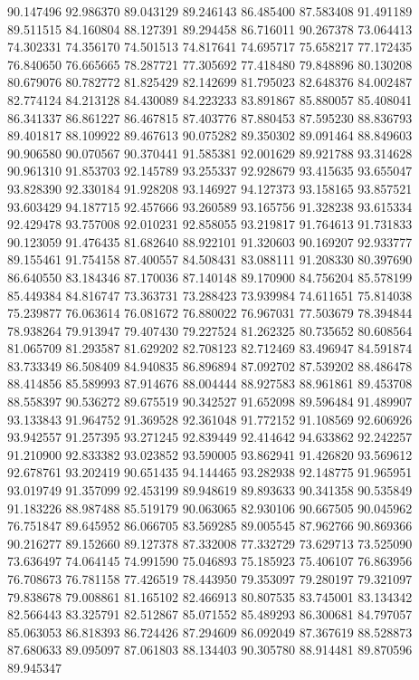 90.147496
92.986370
89.043129
89.246143
86.485400
87.583408
91.491189
89.511515
84.160804
88.127391
89.294458
86.716011
90.267378
73.064413
74.302331
74.356170
74.501513
74.817641
74.695717
75.658217
77.172435
76.840650
76.665665
78.287721
77.305692
77.418480
79.848896
80.130208
80.679076
80.782772
81.825429
82.142699
81.795023
82.648376
84.002487
82.774124
84.213128
84.430089
84.223233
83.891867
85.880057
85.408041
86.341337
86.861227
86.467815
87.403776
87.880453
87.595230
88.836793
89.401817
88.109922
89.467613
90.075282
89.350302
89.091464
88.849603
90.906580
90.070567
90.370441
91.585381
92.001629
89.921788
93.314628
90.961310
91.853703
92.145789
93.255337
92.928679
93.415635
93.655047
93.828390
92.330184
91.928208
93.146927
94.127373
93.158165
93.857521
93.603429
94.187715
92.457666
93.260589
93.165756
91.328238
93.615334
92.429478
93.757008
92.010231
92.858055
93.219817
91.764613
91.731833
90.123059
91.476435
81.682640
88.922101
91.320603
90.169207
92.933777
89.155461
91.754158
87.400557
84.508431
83.088111
91.208330
80.397690
86.640550
83.184346
87.170036
87.140148
89.170900
84.756204
85.578199
85.449384
84.816747
73.363731
73.288423
73.939984
74.611651
75.814038
75.239877
76.063614
76.081672
76.880022
76.967031
77.503679
78.394844
78.938264
79.913947
79.407430
79.227524
81.262325
80.735652
80.608564
81.065709
81.293587
81.629202
82.708123
82.712469
83.496947
84.591874
83.733349
86.508409
84.940835
86.896894
87.092702
87.539202
88.486478
88.414856
85.589993
87.914676
88.004444
88.927583
88.961861
89.453708
88.558397
90.536272
89.675519
90.342527
91.652098
89.596484
91.489907
93.133843
91.964752
91.369528
92.361048
91.772152
91.108569
92.606926
93.942557
91.257395
93.271245
92.839449
92.414642
94.633862
92.242257
91.210900
92.833382
93.023852
93.590005
93.862941
91.426820
93.569612
92.678761
93.202419
90.651435
94.144465
93.282938
92.148775
91.965951
93.019749
91.357099
92.453199
89.948619
89.893633
90.341358
90.535849
91.183226
88.987488
85.519179
90.063065
82.930106
90.667505
90.045962
76.751847
89.645952
86.066705
83.569285
89.005545
87.962766
90.869366
90.216277
89.152660
89.127378
87.332008
77.332729
73.629713
73.525090
73.636497
74.064145
74.991590
75.046893
75.185923
75.406107
76.863956
76.708673
76.781158
77.426519
78.443950
79.353097
79.280197
79.321097
79.838678
79.008861
81.165102
82.466913
80.807535
83.745001
83.134342
82.566443
83.325791
82.512867
85.071552
85.489293
86.300681
84.797057
85.063053
86.818393
86.724426
87.294609
86.092049
87.367619
88.528873
87.680633
89.095097
87.061803
88.134403
90.305780
88.914481
89.870596
89.945347
